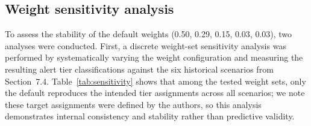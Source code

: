 \documentclass[5p,twocolumn]{elsarticle}
\begin{document}
\begin{table}[htbp]
  \caption{Comparison of flood assessment approaches. The proposed index is the only lightweight, real-time, multi-parameter index suitable for embedded deployment.}
  \label{tab:index_compare}
  \centering
  \scriptsize
  \setlength{\tabcolsep}{2pt}
\end{table}

\subsection{Weight sensitivity analysis}

To assess the stability of the default weights (0.50, 0.29, 0.15, 0.03, 0.03), two analyses were conducted. First, a discrete weight-set sensitivity analysis was performed by systematically varying the weight configuration and measuring the resulting alert tier classifications against the six historical scenarios from Section~7.4. Table~\ref{tab:sensitivity} shows that among the tested weight sets, only the default reproduces the intended tier assignments across all scenarios; we note these target assignments were defined by the authors, so this analysis demonstrates internal consistency and stability rather than predictive validity.
\end{document}
